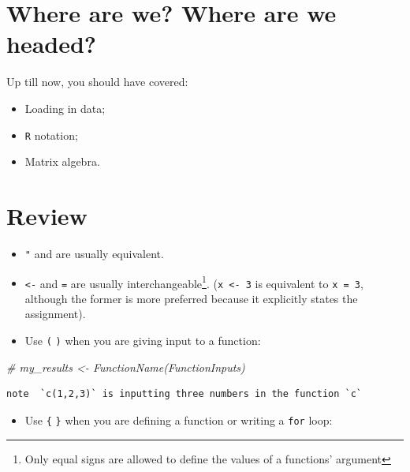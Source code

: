 \documentclass[]{book}
\newenvironment{Shaded}{\begin{snugshade}}{\end{snugshade}}
\newcommand{\CommentTok}[1]{\textcolor[rgb]{0.56,0.35,0.01}{\textit{#1}}}
\providecommand{\tightlist}{%
  \setlength{\itemsep}{0pt}\setlength{\parskip}{0pt}}
\let\rmarkdownfootnote\footnote%
\def\footnote{\protect\rmarkdownfootnote}
\theoremstyle{definition}
\theoremstyle{definition}
\theoremstyle{definition}
\theoremstyle{remark}
\begin{document}
\hypertarget{where-are-we-where-are-we-headed-7}{%
\section*{Where are we? Where are we headed?}\label{where-are-we-where-are-we-headed-7}}

Up till now, you should have covered:

\begin{itemize}
\tightlist
\item
  Loading in data;
\item
  \texttt{R} notation;
\item
  Matrix algebra.
\end{itemize}

\hypertarget{review}{%
\section{Review}\label{review}}

\begin{itemize}
\tightlist
\item
  \texttt{"} and \texttt{\textquotesingle{}} are usually equivalent.
\item
  \texttt{\textless{}-} and \texttt{=} are usually interchangeable\footnote{Only equal signs are allowed to define the values of a functions' argument}. (\texttt{x\ \textless{}-\ 3} is equivalent to \texttt{x\ =\ 3}, although the former is more preferred because it explicitly states the assignment).
\item
  Use \texttt{(} \texttt{)} when you are giving input to a function:
\end{itemize}

\begin{Shaded}
\begin{Highlighting}[]
\CommentTok{# my_results <- FunctionName(FunctionInputs)}
\end{Highlighting}
\end{Shaded}

\begin{verbatim}
note  `c(1,2,3)` is inputting three numbers in the function `c`
\end{verbatim}

\begin{itemize}
\tightlist
\item
  Use \texttt{\{} \texttt{\}} when you are defining a function or writing a \texttt{for} loop:
\end{itemize}
\end{document}
